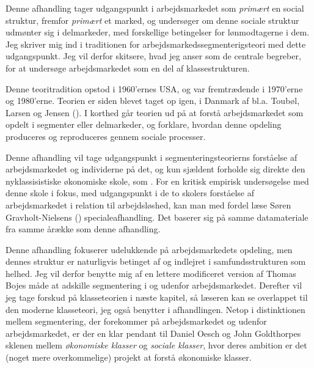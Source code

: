 Denne afhandling tager udgangspunkt i arbejdsmarkedet som \emph{primært} en social struktur, fremfor \emph{primært} et marked, og undersøger om denne sociale struktur udmønter sig i delmarkeder, med forskellige betingelser for lønmodtagerne i dem. Jeg skriver mig ind i traditionen for arbejdsmarkedssegmenterigsteori med dette udgangspunkt. Jeg vil derfor skitsere, hvad jeg anser som de centrale begreber, for at undersøge arbejdsmarkedet som en del af klassestrukturen. 

Denne teoritradition opstod i 1960'ernes USA, og var fremtrædende i 1970'erne og 1980'erne. Teorien er siden blevet taget op igen, i Danmark af bl.a. Toubøl, Larsen og Jensen (\citeyear{Touboel2013}). I korthed går teorien ud på at forstå arbejdsmarkedet som opdelt i segmenter eller delmarkeder, og forklare, hvordan denne opdeling produceres og reproduceres gennem sociale processer.




Denne afhandling vil tage udgangspunkt i segmenteringsteorierns forståelse af  arbejdsmarkedet og individerne på det, og kun sjældent forholde sig direkte den nyklassisistiske økonomiske skole, som . For en kritisk empirisk undersøgelse med denne skole i fokus, med udgangspunkt i de to skolers forståelse af arbejdsmarkedet i relation til arbejdsløshed, kan man med fordel læse Søren Gravholt-Nielsens (\citeyear{Gravholt-Nielsen2016}) specialeafhandling. Det baserer sig på samme datamateriale fra samme årække som denne afhandling. 

Denne afhandling fokuserer udelukkende på arbejdsmarkedets opdeling, men dennes struktur er naturligvis betinget af og indlejret i samfundsstrukturen som helhed. Jeg vil derfor benytte mig af en lettere modificeret version af Thomas Bojes måde at adskille segmentering i og udenfor arbejdsmarkedet. Derefter vil jeg tage forskud på klasseteorien i næste kapitel, så læseren kan se overlappet til den moderne klasseteori, jeg også benytter i afhandlingen. Netop i distinktionen mellem segmentering, der forekommer på arbejdsmarkedet og udenfor arbejdsmarkedet, er der en klar pendant til Daniel Oesch og John Goldthorpes sklenen mellem \emph{økonomiske klasser} og \emph{sociale klasser}, hvor deres ambition er det (noget mere overkommelige) projekt at forstå økonomiske klasser. 

